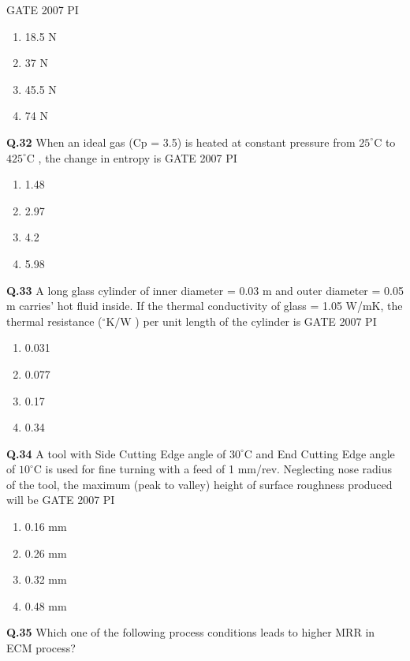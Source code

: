 \documentclass[journal,12pt,onecolumn]{exam}
\theoremstyle{remark}
\begin{document}
 \hfill{GATE 2007 PI}
 \begin{enumerate}
     \item 18.5 N
     \item 37 N
     \item 45.5 N
     \item 74 N
 \end{enumerate}
 \noindent
 \textbf{Q.32}
 When an ideal gas (Cp = 3.5) is heated at constant pressure from $25^\circ\mathrm{C}$
 to $425^\circ\mathrm{C}$
, the change in entropy is
\hfill{GATE 2007 PI}
\begin{enumerate}
    \item 1.48
    \item 2.97
    \item 4.2
    \item 5.98
\end{enumerate}
\noindent
\textbf{Q.33}
A long glass cylinder of inner diameter = 0.03 m and outer diameter = 0.05 m carries' hot fluid inside. If the thermal conductivity of glass = 1.05 W/mK, the thermal resistance ($^\circ\mathrm{K}\!/\mathrm{W}$
) per unit length of the cylinder is
\hfill{GATE 2007 PI}
\begin{enumerate}
    \item 0.031
    \item 0.077
    \item 0.17
    \item 0.34
\end{enumerate}
\noindent
\textbf{Q.34}
	A tool with Side Cutting Edge angle of $30^\circ\mathrm{C}$
 and End Cutting Edge angle of $10^\circ\mathrm{C}$
 is used for fine turning with a feed of 1 mm/rev. Neglecting nose radius of the tool, the maximum (peak to valley) height of surface roughness produced will be
 \hfill{GATE 2007 PI}
 \begin{enumerate}
     \item 0.16 mm
     \item 0.26 mm
     \item 0.32 mm
     \item 0.48 mm
      \end{enumerate}
      \noindent
      \textbf{Q.35}
	Which one of the following process conditions leads to higher MRR in ECM process?
    
\end{document}
